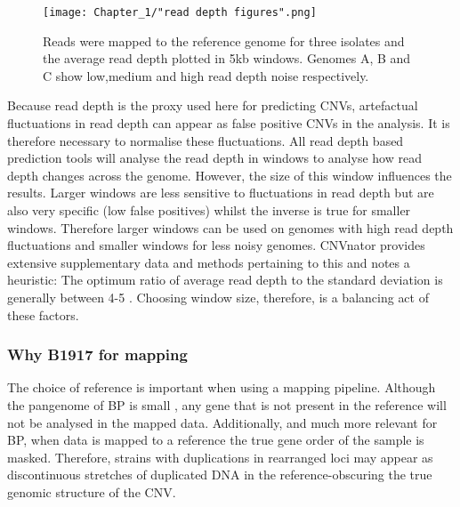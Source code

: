 \documentclass{article}
\begin{document}
\begin{figure}[h]

\texttt{[image: Chapter\_1/"read depth figures".png]}
\caption{Reads were mapped to the reference genome for three isolates and the average read depth plotted in 5kb windows. Genomes A, B and C show low,medium and high read depth noise respectively.}
\label{fig:Schematic_graph}
\end{figure}

Because read depth is the proxy used here for predicting CNVs, artefactual fluctuations in read depth can appear as false positive CNVs in the analysis. It is therefore necessary to normalise these fluctuations. All read depth based prediction tools will analyse the read depth in windows to analyse how read depth changes across the genome. However, the size of this window influences the results. Larger windows are less sensitive to fluctuations in read depth but are also very specific (low false positives) whilst the inverse is true for smaller windows. Therefore larger windows can be used on genomes with high read depth fluctuations and smaller windows for less noisy genomes. CNVnator provides extensive supplementary data and methods pertaining to this and notes a heuristic: The optimum ratio of average read depth to the standard deviation is generally between 4-5 \cite{Abyzov2011CNVnator:Sequencing}. Choosing window size, therefore, is a balancing act of these factors.


\subsubsection{Why B1917 for mapping}

The choice of reference is important when using a mapping pipeline. Although the pangenome of BP is small \cite{Park2012ComparativePathogensc}, any gene that is not present in the reference will not be analysed in the mapped data. Additionally, and much more relevant for BP, when data is mapped to a reference the true gene order of the sample is masked. Therefore, strains with duplications in rearranged loci may appear as discontinuous stretches of duplicated DNA in the reference-obscuring the true genomic structure of the CNV.
\end{document}

